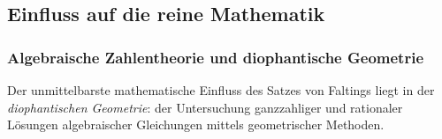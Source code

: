 ﻿\documentclass[12pt,a4paper]{article}
\theoremstyle{plain}
\theoremstyle{definition}
\theoremstyle{remark}
\begin{document}
\subsection{Einfluss auf die reine Mathematik}

\subsubsection{Algebraische Zahlentheorie und diophantische Geometrie}

Der unmittelbarste mathematische Einfluss des Satzes von Faltings liegt in der
\emph{diophantischen Geometrie}: der Untersuchung ganzzahliger und rationaler Lösungen
algebraischer Gleichungen mittels geometrischer Methoden.
\end{document}
